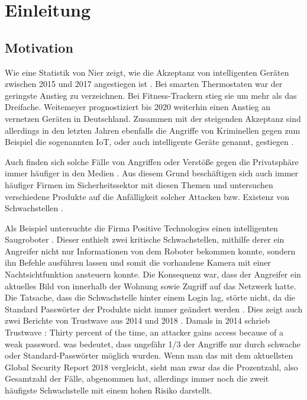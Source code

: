 \chapter{Einleitung}

\section{Motivation}
Wie eine Statistik von Nier zeigt, wie die Akzeptanz von intelligenten Geräten zwischen 2015 und 2017 angestiegen ist \cite{nier_2017}. Bei smarten Thermostaten war der geringste Anstieg zu verzeichnen. Bei Fitness-Trackern stieg sie um mehr als das Dreifache. Weitemeyer \cite{weitemeyer_2018} prognostiziert bis 2020 weiterhin einen Anstieg an vernetzen Geräten in Deutschland.
Zusammen mit der steigenden Akzeptanz sind allerdings in den letzten Jahren ebenfalls die Angriffe von Kriminellen gegen zum Beispiel die sogenannten \ac{IoT}, oder auch intelligente Geräte genannt, gestiegen  \cite{statista_2019}.

Auch finden sich solche Fälle von Angriffen oder Verstöße gegen die Privatsphäre immer häufiger in den Medien \cite{holland_2016} \cite{it_verlag_informationstechnik_gmbh_2018}. Aus diesem Grund beschäftigen sich auch immer häufiger Firmen im Sicherheitssektor mit diesen Themen und untersuchen verschiedene Produkte auf die Anfälligkeit solcher Attacken bzw. Existenz von Schwachstellen \cite{lorenz_2018} \cite{ao_kaspersky_lab_2018}.

Als Beispiel untersuchte die Firma Positive Technologies einen intelligenten Saugroboter \cite{salmi_2017}.
Dieser enthielt zwei kritische Schwachstellen, mithilfe derer ein Angreifer nicht nur Informationen von dem Roboter bekommen konnte, sondern ihn Befehle ausführen lassen und somit die vorhandene Kamera mit einer Nachtsichtfunktion ansteuern konnte. Die Konsequenz war, dass der Angreifer ein aktuelles Bild von innerhalb der Wohnung sowie Zugriff auf das Netzwerk hatte. Die Tatsache, dass die Schwachstelle hinter einem Login lag, störte nicht, da die Standard Passwörter der Produkte nicht immer geändert werden \cite{positive_technologies_2018}.
Dies zeigt auch zwei Berichte von Trustwave aus 2014 und 2018 \cite{trustwave_holdings_inc_2014} \cite{trustwave_holdings_inc_2018}.
Damals in 2014 schrieb Trustwave \cite{trustwave_holdings_inc_2014}: \glqq Thirty percent of the time, an attacker gains access because of a weak password.\grqq{}
was bedeutet, dass ungefähr 1/3 der Angriffe nur durch schwache oder Standard-Passwörter möglich wurden. Wenn man das mit dem aktuellsten Global Security Report 2018 vergleicht, sieht man zwar das die Prozentzahl, also Gesamtzahl der Fälle, abgenommen hat, allerdings immer noch die zweit häufigste Schwachstelle mit einem hohen Risiko darstellt.

